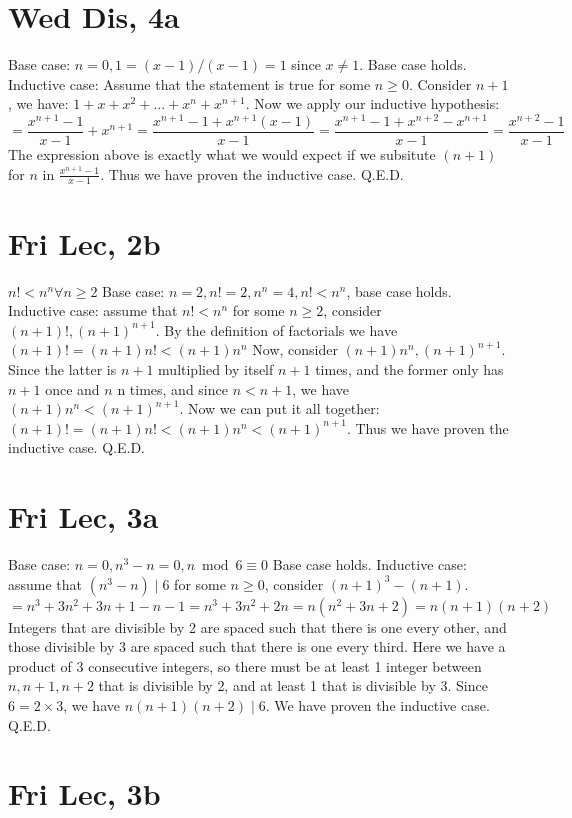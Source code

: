 \documentclass[12pt]{article}
\begin{document}
\section{Wed Dis, 4a}
Base case: $n = 0, 1 = (x-1)/(x-1) = 1$ since $x \neq 1$. Base case holds.
\newline
Inductive case: Assume that the statement is true for some $n \geq 0$. Consider $n+1$, we have: $1 + x + x^2 + ... + x^n + x^{n+1}$. Now we apply our inductive hypothesis:
$$= \frac{x^{n+1}-1}{x-1} + x^{n+1} = \frac{x^{n+1}-1+x^{n+1}(x-1)}{x-1} = \frac{x^{n+1}-1+x^{n+2}-x^{n+1}}{x-1} = \frac{x^{n+2}-1}{x-1}$$
The expression above is exactly what we would expect if we subsitute $(n+1)$ for $n$ in $\frac{x^{n+1}-1}{x-1}$. Thus we have proven the inductive case. Q.E.D.
\newpage


\section{Fri Lec, 2b}
$n! < n^n \forall n \geq 2$
\newline
Base case: $n=2, n!=2, n^n=4, n! < n^n$, base case holds.
\newline
Inductive case: assume that $n! < n^n$ for some $n \geq 2$, consider $(n+1)!, (n+1)^{n+1}$. By the definition of factorials we have $(n+1)! = (n+1)n! < (n+1)n^n$
\newline
Now, consider $(n+1)n^n, (n+1)^{n+1}$. Since the latter is $n+1$ multiplied by itself $n+1$ times, and the former only has $n+1$ once and $n$ n times, and since $n<n+1$, we have $(n+1)n^n < (n+1)^{n+1}$.
\newline
Now we can put it all together: $(n+1)! = (n+1)n! < (n+1)n^n < (n+1)^{n+1}$. Thus we have proven the inductive case. Q.E.D.

\section{Fri Lec, 3a}
Base case: $n = 0, n^3-n = 0, n \bmod 6 \equiv 0$ Base case holds.
\newline
Inductive case: assume that $(n^3-n) \mid 6$ for some $n \geq 0$, consider $(n+1)^3-(n+1)$.
$$= n^3 + 3n^2 + 3n + 1 - n -1 = n^3+3n^2+2n = n(n^2+3n+2) = n(n+1)(n+2)$$
Integers that are divisible by 2 are spaced such that there is one every other, and those divisible by 3 are spaced such that there is one every third. Here we have a product of 3 consecutive integers, so there must be at least 1 integer between $n, n+1, n+2$ that is divisible by 2, and at least 1 that is divisible by 3. Since $6=2 \times 3$, we have $n(n+1)(n+2) \mid 6$.
\newline
We have proven the inductive case. Q.E.D.

\section{Fri Lec, 3b}
\end{document}
